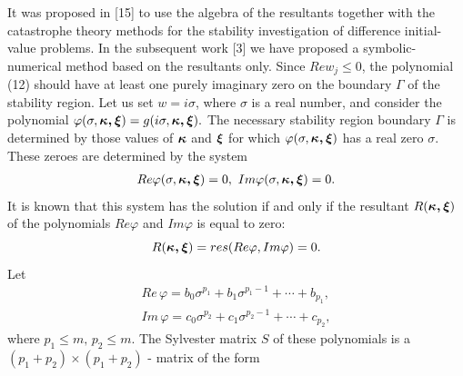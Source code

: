    It was proposed in [15] to use the algebra of the resultants together with
the catastrophe theory methods for the stability investigation of difference
initial-value problems. In the subsequent work [3] we have proposed a
symbolic-numerical method based on the resultants only. Since $Re w_j\leq 0$,
the polynomial (12) should have at least one purely imaginary zero on the
boundary $\Gamma$ of the stability region. Let us set $w=i\sigma$, where
$\sigma$ is a real number, and consider the polynomial
$\varphi(\sigma,\mbox{\boldmath $\kappa,\xi$\unboldmath})= g(i\sigma,
\mbox{\boldmath $\kappa,\xi$\unboldmath}).$ The necessary stability region
boundary $\Gamma$ is determined by those values of
$\mbox{\boldmath $\kappa$\unboldmath}$ and $\mbox{\boldmath $\xi$\unboldmath}$
for which $\varphi(\sigma,\mbox{\boldmath $\kappa,\xi$\unboldmath})$
has a real zero $\sigma$. These zeroes are determined by the system
\begin{eqnarray}
Re \varphi(\sigma,\mbox{\boldmath $\kappa,\xi$\unboldmath})=0,~
Im \varphi(\sigma,\mbox{\boldmath $\kappa,\xi$\unboldmath})=0.
\end{eqnarray}
It is known that this system has the solution if and only if the resultant
$R(\mbox{\boldmath $\kappa,\xi$\unboldmath})$ of the polynomials $Re \varphi$
and $Im \varphi$ is equal to zero:
\begin{equation}
R(\mbox{\boldmath $\kappa,\xi$\unboldmath})=res(Re\varphi,Im\varphi)=0.
\end{equation}
Let
\begin{eqnarray*}
Re\, \varphi = b_{0}\sigma^{p_{1}}+b_{1}\sigma^{p_{1}-1}+\cdots+b_{p_{1}},\\
Im\, \varphi = c_{0}\sigma^{p_{2}}+c_{1}\sigma^{p_{2}-1}+\cdots+c_{p_{2}},
\end{eqnarray*}
where $p_{1}\leq m,\, p_{2}\leq m$.
The Sylvester matrix $S$ of these polynomials
is a $(p_{1}+p_{2})\times (p_{1}+p_{2})$ - matrix of the form
